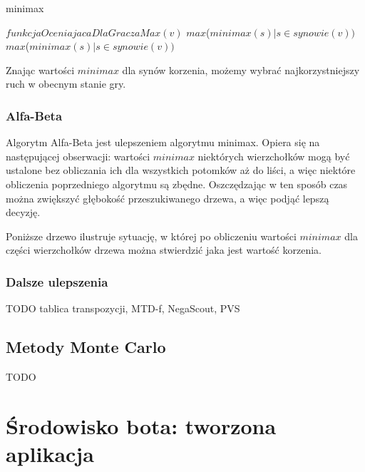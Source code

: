 \documentclass{pracamgr}
\begin{document}
\begin{algorithm}
\caption{minimax}\label{minimax}
\begin{algorithmic}[1]
	\State \Return $funkcjaOceniajacaDlaGraczaMax(v)$
\EndIf
{}
	\State \Return $max$($minimax(s) | s \in synowie(v))$
\Else
	\State \Return $max$($minimax(s) | s \in synowie(v))$
\EndIf
\EndFunction
\end{algorithmic}
\end{algorithm}

Znając wartości \(minimax\) dla synów korzenia, możemy wybrać najkorzystniejszy ruch w obecnym stanie gry.

\subsection{Alfa-Beta}

Algorytm Alfa-Beta jest ulepszeniem algorytmu minimax. Opiera się na następującej obserwacji: wartości \(minimax\) niektórych wierzchołków mogą być ustalone bez obliczania ich dla wszystkich potomków aż do liści, a więc niektóre obliczenia poprzedniego algorytmu są zbędne. Oszczędzając w ten sposób czas można zwiększyć głębokość przeszukiwanego drzewa, a więc podjąć lepszą decyzję.

Poniższe drzewo ilustruje sytuację, w której po obliczeniu wartości \(minimax\) dla części wierzchołków drzewa można stwierdzić jaka jest wartość korzenia.

\begin{center}\end{center}

\subsection{Dalsze ulepszenia}

TODO tablica transpozycji, MTD-f, NegaScout, PVS

\section{Metody Monte Carlo}

TODO

\chapter{Środowisko bota: tworzona aplikacja}
\end{document}
